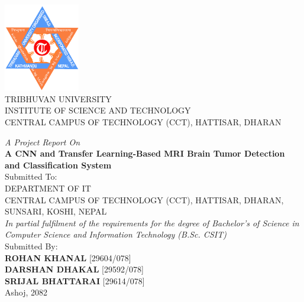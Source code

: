 {
\centering
\normalsize

\includegraphics[width=1.3in]{Images/TUlogo.png}\\

{TRIBHUVAN UNIVERSITY}\\
{INSTITUTE OF SCIENCE AND TECHNOLOGY}\\
CENTRAL CAMPUS OF TECHNOLOGY (CCT), HATTISAR, DHARAN
\\[1.5cm]
{\textit{A Project Report On}\\
{\bf A CNN and Transfer Learning-Based MRI Brain Tumor Detection and Classification System }\\[1.5cm]

Submitted To:\\ DEPARTMENT OF IT \\ CENTRAL CAMPUS OF TECHNOLOGY (CCT),
HATTISAR, DHARAN, SUNSARI, KOSHI, NEPAL\\[1.5cm]

\textit{In partial fulfilment of the requirements for the degree of Bachelor's of Science in Computer Science and Information Technology  (B.Sc. CSIT)}\\[1.5cm]

Submitted By:\\ {\bf ROHAN KHANAL} [29604/078]\\ {\bf DARSHAN DHAKAL} [29592/078]\\ {\bf SRIJAL BHATTARAI} [29614/078]\\[3.5cm]


Ashoj, 2082

}

}

